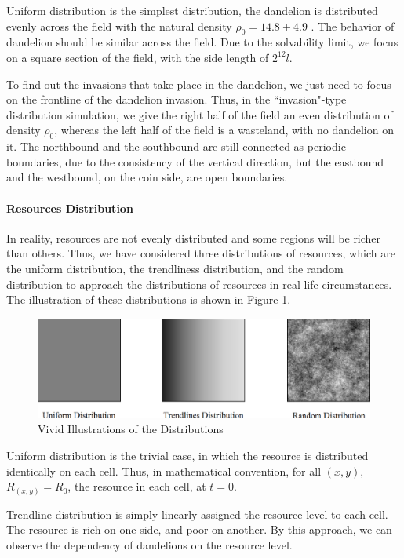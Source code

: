 \documentclass[12pt]{article}
\begin{document}
Uniform distribution is the simplest distribution, the dandelion is distributed evenly across the field with the natural density $\rho_0=14.8\pm 4.9$ \cite{eggert_yield_2018}. The behavior of dandelion should be similar across the field. Due to the solvability limit, we focus on a square section of the field, with the side length of $2^{12} l$.

To find out the invasions that take place in the dandelion, we just need to focus on the frontline of the dandelion invasion. Thus, in the ``invasion"-type distribution simulation, we give the right half of the field an even distribution of density $\rho_0$, whereas the left half of the field is a wasteland, with no dandelion on it. The northbound and the southbound are still connected as periodic boundaries, due to the consistency of the vertical direction, but the eastbound and the westbound, on the coin side, are open boundaries.

\paragraph{Resources Distribution}
In reality, resources are not evenly distributed and some regions will be richer than others. Thus, we have considered three distributions of resources, which are the uniform distribution, the trendliness distribution, and the random distribution to approach the distributions of resources in real-life circumstances. The illustration of these distributions is shown in \hyperref[Distributions]{Figure \ref*{Distributions}}.
\begin{figure}[h]
    \centering
    \includegraphics[width=0.5\linewidth]{img/Distributions.png}
    \caption{Vivid Illustrations of the Distributions}
    \label{Distributions}
\end{figure}

Uniform distribution is the trivial case, in which the resource is distributed identically on each cell. Thus, in mathematical convention, for all $(x,y)$, $R_{(x,y)}=R_0$, the resource in each cell, at $t=0$.

Trendline distribution is simply linearly assigned the resource level to each cell. The resource is rich on one side, and poor on another. By this approach, we can observe the dependency of dandelions on the resource level.
\end{document}
